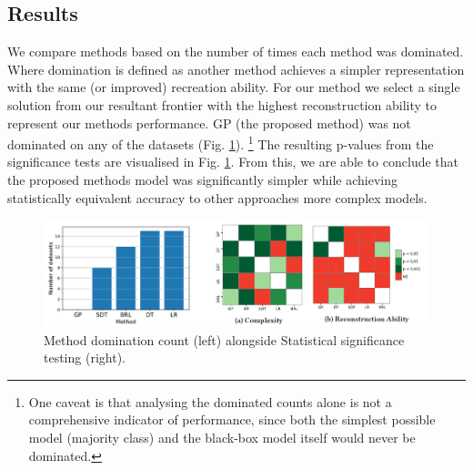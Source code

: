 \subsection{Results}
We compare methods based on the number of times each method was dominated. Where domination is defined as another method achieves a simpler representation with the same (or improved) recreation ability. For our method we select a single solution from our resultant frontier with the highest reconstruction ability to represent our methods performance. GP (the proposed method) was not dominated on any of the datasets (Fig. \ref{fig:results}). \footnote{One caveat is that analysing the dominated counts alone is not a comprehensive indicator of performance, since both the simplest possible model (majority class) and the black-box model itself would never be dominated.} The resulting p-values from the significance tests are visualised in Fig. \ref{fig:results}. From this, we are able to conclude that the proposed method\textquotesingle s model was significantly simpler while achieving statistically equivalent accuracy to other approaches\textquotesingle{} more complex models.
%


\begin{center}
\begin{figure}[h]
\includegraphics[width=\columnwidth]{results}
\caption{Method domination count (left) alongside Statistical significance testing (right).}
\label{fig:results}
\end{figure}
\end{center}





